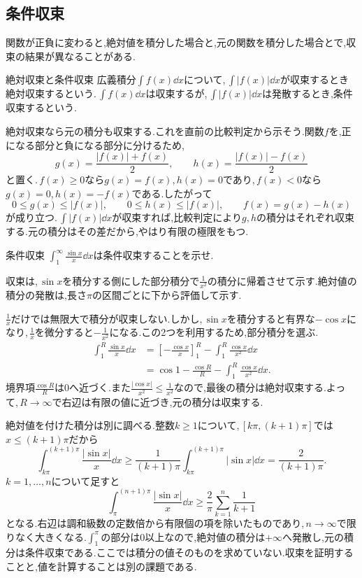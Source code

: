 \subsection{条件収束}

関数が正負に変わると,絶対値を積分した場合と,元の関数を積分した場合とで,収束の結果が異なることがある.

\begin{definition}{絶対収束と条件収束}
広義積分$\int f(x)\dd x$について,\,$\int|f(x)|\dd x$が収束するとき絶対収束するという.\,$\int f(x)\dd x$は収束するが,\,$\int|f(x)|\dd x$は発散するとき,条件収束するという.
\end{definition}

絶対収束なら元の積分も収束する.これを直前の比較判定から示そう.関数$f$を,正になる部分と負になる部分に分けるため,
\[
 g(x)=\frac{|f(x)|+f(x)}2,\qquad
 h(x)=\frac{|f(x)|-f(x)}2
\]
と置く.\,$f(x)\ge0$なら$g(x)=f(x)$,\,$h(x)=0$であり,\,$f(x)<0$なら$g(x)=0$,\,$h(x)=-f(x)$である.したがって
\[
 0\le g(x)\le|f(x)|,\qquad
 0\le h(x)\le|f(x)|,\qquad f(x)=g(x)-h(x)
\]
が成り立つ.\,$\int|f(x)|\dd x$が収束すれば,比較判定により$g,h$の積分はそれぞれ収束する.元の積分はその差だから,やはり有限の極限をもつ.

\begin{example}{条件収束}
$\int_1^{\infty}\frac{\sin x}{x}\dd x$は条件収束することを示せ.
\end{example}

収束は,\,$\sin x$を積分する側にした部分積分で$\frac1{x^2}$の積分に帰着させて示す.絶対値の積分の発散は,長さ$\pi$の区間ごとに下から評価して示す.

$\frac1x$だけでは無限大で積分が収束しない.しかし,\,$\sin x$を積分すると有界な$-\cos x$になり,\,$\frac1x$を微分すると$-\frac1{x^2}$になる.この2つを利用するため,部分積分を選ぶ.
\begin{align*}
 \int_1^R\frac{\sin x}{x}\dd x
 &=\left[-\frac{\cos x}{x}\right]_1^R
   -\int_1^R\frac{\cos x}{x^2}\dd x\\
 &=\cos1-\frac{\cos R}{R}-\int_1^R\frac{\cos x}{x^2}\dd x.
\end{align*}
境界項$\frac{\cos R}{R}$は$0$へ近づく.また$\frac{|\cos x|}{x^2}\le\frac1{x^2}$なので,最後の積分は絶対収束する.よって,\,$R\to\infty$で右辺は有限の値に近づき,元の積分は収束する.

絶対値を付けた積分は別に調べる.整数$k\ge1$について,\,$[k\pi,(k+1)\pi]$では$x\le(k+1)\pi$だから
\[
 \int_{k\pi}^{(k+1)\pi}\frac{|\sin x|}{x}\dd x
 \ge\frac1{(k+1)\pi}\int_{k\pi}^{(k+1)\pi}|\sin x|\dd x
 =\frac2{(k+1)\pi}.
\]
$k=1,\ldots,n$について足すと
\[
 \int_{\pi}^{(n+1)\pi}\frac{|\sin x|}{x}\dd x
 \ge\frac2{\pi}\sum_{k=1}^{n}\frac1{k+1}
\]
となる.右辺は調和級数の定数倍から有限個の項を除いたものであり,\,$n\to\infty$で限りなく大きくなる.$\int_1^{\pi}$の部分は$0$以上なので,絶対値の積分は$+\infty$へ発散し,元の積分は条件収束である.ここでは積分の値そのものを求めていない.収束を証明することと,値を計算することは別の課題である.




